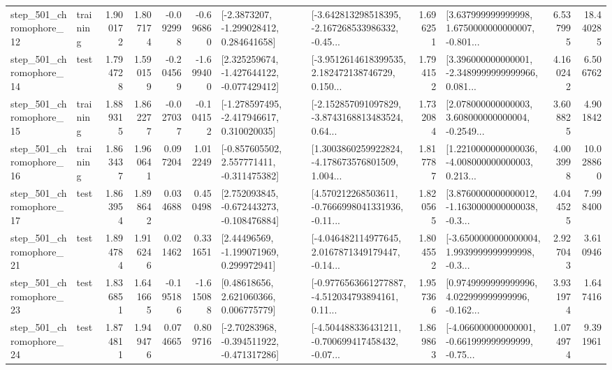 \begin{tabular}{llrrrrllrlrr}
  step\_501\_chromophore\_12 &  training &      1.900172 &    1.807174 &     -0.092998 & -0.696860 &     [-2.3873207, -1.299028412, 0.284641658] &  [-3.642813298518395, -2.167268533986332, -0.45... &       1.696251 &  [3.637999999999998, 1.6750000000000007, -0.801... &            6.537995 &         18.440285 \\
  step\_501\_chromophore\_14 &      test &      1.794728 &    1.590159 &     -0.204569 & -1.699400 &   [2.325259674, -1.427644122, -0.077429412] &  [-3.9512614618399535, 2.182472138746729, 0.150... &       1.794152 &  [3.396000000000001, -2.3489999999999966, 0.081... &            4.160242 &          6.506762 \\
  step\_501\_chromophore\_15 &  training &      1.889315 &    1.862277 &     -0.027037 & -0.104152 &   [-1.278597495, -2.417946617, 0.310020035] &  [-2.152857091097829, -3.8743168813483524, 0.64... &       1.732084 &  [2.078000000000003, 3.608000000000004, -0.2549... &            3.608825 &          4.901842 \\
  step\_501\_chromophore\_16 &  training &      1.863437 &    1.960641 &      0.097204 &  1.012249 &   [-0.857605502, 2.557771411, -0.311475382] &  [1.3003860259922824, -4.178673576801509, 1.004... &       1.817787 &  [1.2210000000000036, -4.008000000000003, 0.213... &            4.003998 &         10.028860 \\
  step\_501\_chromophore\_17 &      test &      1.863954 &    1.898642 &      0.034688 &  0.450498 &   [2.752093845, -0.672443273, -0.108476884] &  [4.570212268503611, -0.7666998041331936, -0.11... &       1.820565 &  [3.8760000000000012, -1.1630000000000038, -0.3... &            4.044525 &          7.998400 \\
  step\_501\_chromophore\_21 &      test &      1.894784 &    1.916246 &      0.021462 &  0.331651 &     [2.44496569, -1.199071969, 0.299972941] &  [-4.046482114977645, 2.0167871349179447, -0.14... &       1.804552 &  [-3.6500000000000004, 1.9939999999999998, -0.3... &            2.927043 &          3.610946 \\
  step\_501\_chromophore\_23 &      test &      1.836851 &    1.641665 &     -0.195186 & -1.615088 &      [0.48618656, 2.621060366, 0.006775779] &  [-0.9776563661277887, -4.512034793894161, 0.11... &       1.957366 &  [0.9749999999999996, 4.022999999999996, -0.162... &            3.931974 &          1.647416 \\
  step\_501\_chromophore\_24 &      test &      1.874811 &    1.949476 &      0.074665 &  0.809716 &   [-2.70283968, -0.394511922, -0.471317286] &  [-4.504488336431211, -0.700699417458432, -0.07... &       1.869863 &  [-4.066000000000001, -0.661999999999999, -0.75... &            1.074974 &          9.391961 \\

\end{tabular}
